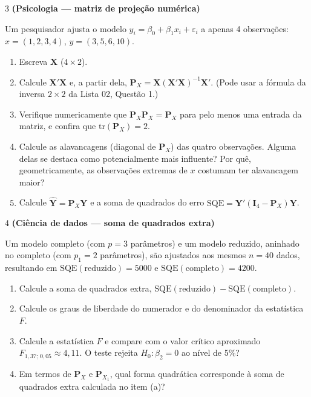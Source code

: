\documentclass[11pt]{article}
\begin{document}
\begin{questao}{3} \textbf{(Psicologia --- matriz de projeção numérica)}

Um pesquisador ajusta o modelo $y_i = \beta_0 + \beta_1 x_i + \varepsilon_i$ a apenas 4
observações: $x = (1,2,3,4)$, $y = (3,5,6,10)$.

\begin{enumerate}[label=(\alph*)]
  \item Escreva $\mathbf{X}$ ($4\times 2$).
  \item Calcule $\mathbf{X}'\mathbf{X}$ e, a partir dela, $\mathbf{P}_X =
    \mathbf{X}(\mathbf{X}'\mathbf{X})^{-1}\mathbf{X}'$. (Pode usar a fórmula da inversa
    $2\times2$ da Lista 02, Questão 1.)
  \item Verifique numericamente que $\mathbf{P}_X\mathbf{P}_X = \mathbf{P}_X$ para pelo menos uma
    entrada da matriz, e confira que $\mathrm{tr}(\mathbf{P}_X) = 2$.
  \item Calcule as alavancagens (diagonal de $\mathbf{P}_X$) das quatro observações. Alguma delas
    se destaca como potencialmente mais influente? Por quê, geometricamente, as observações
    extremas de $x$ costumam ter alavancagem maior?
  \item Calcule $\hat{\mathbf{Y}} = \mathbf{P}_X\mathbf{Y}$ e a soma de quadrados do erro
    $\mathrm{SQE} = \mathbf{Y}'(\mathbf{I}_4-\mathbf{P}_X)\mathbf{Y}$.
\end{enumerate}
\end{questao}

\begin{questao}{4} \textbf{(Ciência de dados --- soma de quadrados extra)}

Um modelo completo (com $p=3$ parâmetros) e um modelo reduzido, aninhado no completo (com
$p_1=2$ parâmetros), são ajustados aos mesmos $n=40$ dados, resultando em
$\mathrm{SQE}(\text{reduzido}) = 5000$ e $\mathrm{SQE}(\text{completo}) = 4200$.

\begin{enumerate}[label=(\alph*)]
  \item Calcule a soma de quadrados extra, $\mathrm{SQE}(\text{reduzido}) -
    \mathrm{SQE}(\text{completo})$.
  \item Calcule os graus de liberdade do numerador e do denominador da estatística $F$.
  \item Calcule a estatística $F$ e compare com o valor crítico aproximado $F_{1,37;\,0{,}05}
    \approx 4{,}11$. O teste rejeita $H_0: \beta_2 = 0$ ao nível de 5\%?
  \item Em termos de $\mathbf{P}_X$ e $\mathbf{P}_{X_1}$, qual forma quadrática corresponde à soma
    de quadrados extra calculada no item (a)?
\end{enumerate}
\end{questao}
\end{document}

